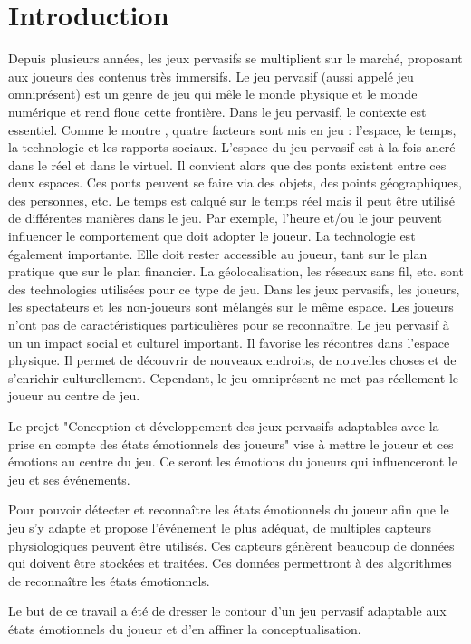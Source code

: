 \documentclass{article}
\begin{document}
\section{Introduction}
	Depuis plusieurs années, les jeux pervasifs se multiplient sur le marché, proposant aux joueurs des contenus très immersifs.
	Le jeu pervasif (aussi appelé jeu omniprésent) est un genre de jeu qui mêle le monde physique et le monde numérique et rend floue cette frontière.
	Dans le jeu pervasif, le contexte est essentiel. 
	Comme le montre \cite{astic_2013}, quatre facteurs sont mis en jeu : l'espace, le temps, la technologie et les rapports sociaux. 
	L'espace du jeu pervasif est à la fois ancré dans le réel et dans le virtuel.
	Il convient alors que des ponts existent entre ces deux espaces. 
	Ces ponts peuvent se faire via des objets, des points géographiques, des personnes, etc. 
	Le temps est calqué sur le temps réel mais il peut être utilisé de différentes manières dans le jeu. 
	Par exemple, l'heure et/ou le jour peuvent influencer le comportement que doit adopter le joueur.
	La technologie est également importante. 
	Elle doit rester accessible au joueur, tant sur le plan pratique que sur le plan financier. 
	La géolocalisation, les réseaux sans fil, etc. sont des technologies utilisées pour ce type de jeu.
	Dans les jeux pervasifs, les joueurs, les spectateurs et les non-joueurs sont mélangés sur le même espace. 
	Les joueurs n'ont pas de caractéristiques particulières pour se reconnaître.%
	Le jeu pervasif à un un impact social et culturel important.
	Il favorise les récontres dans l'espace physique.
	Il permet de découvrir de nouveaux endroits, de nouvelles choses et de s'enrichir culturellement.
	Cependant, le jeu omniprésent ne met pas réellement le joueur au centre de jeu.\par
	Le projet "Conception et développement des jeux pervasifs adaptables avec la prise en compte des états émotionnels des joueurs" vise à mettre le joueur et ces émotions au centre du jeu.
	Ce seront les émotions du joueurs qui influenceront le jeu et ses événements.\par
	Pour pouvoir détecter et reconnaître les états émotionnels du joueur afin que le jeu s'y adapte et propose l'événement le plus adéquat, de multiples capteurs physiologiques peuvent être utilisés.
	Ces capteurs génèrent beaucoup de données qui doivent être stockées et traitées.
	Ces données permettront à des algorithmes de reconnaître les états émotionnels.\par
	Le but de ce travail a été de dresser le contour d'un jeu pervasif adaptable aux états émotionnels du joueur et d'en affiner la conceptualisation.
\end{document}
